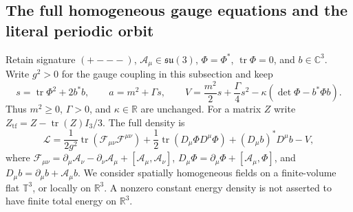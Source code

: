 \subsection{The full homogeneous gauge equations and the literal periodic orbit}

Retain signature $(+---)$, $\mathcal A_\mu\in\mathfrak{su}(3)$,
$\Phi=\Phi^*$, $\operatorname{tr}\Phi=0$, and $b\in\mathbb C^3$.
Write $g^2>0$ for the gauge coupling in this subsection and keep
\[
 s=\operatorname{tr}\Phi^2+2b^*b,\qquad
 a=m^2+\Gamma s,\qquad
 V=\frac{m^2}{2}s+\frac{\Gamma}{4}s^2-\kappa(\det\Phi-b^*\Phi b).
\]
Thus $m^2\geq0$, $\Gamma>0$, and $\kappa\in\mathbb R$ are unchanged.
For a matrix $Z$ write
$Z_{\mathrm{tf}}=Z-\operatorname{tr}(Z)I_3/3$. The full density is
\begin{equation}\label{q444:full-gauge-density}
 \mathcal L=\frac1{2g^2}\operatorname{tr}
 (\mathcal F_{\mu\nu}\mathcal F^{\mu\nu})
 +\frac12\operatorname{tr}(D_\mu\Phi D^\mu\Phi)
 +(D_\mu b)^*D^\mu b-V,
\end{equation}
where $\mathcal F_{\mu\nu}=\partial_\mu\mathcal A_\nu-
\partial_\nu\mathcal A_\mu+[\mathcal A_\mu,\mathcal A_\nu]$,
$D_\mu\Phi=\partial_\mu\Phi+[\mathcal A_\mu,\Phi]$, and
$D_\mu b=\partial_\mu b+\mathcal A_\mu b$.
We consider spatially homogeneous fields on a finite-volume flat
$\mathbb T^3$, or locally on $\mathbb R^3$. A nonzero constant energy
density is not asserted to have finite total energy on $\mathbb R^3$.

